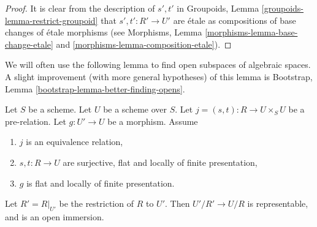 \begin{proof}
It is clear from the description of $s', t'$ in
Groupoids, Lemma \ref{groupoids-lemma-restrict-groupoid}
that $s' , t' : R' \to U'$ are \'etale
as compositions of base changes of \'etale morphisms
(see Morphisms, Lemma \ref{morphisms-lemma-base-change-etale}
and \ref{morphisms-lemma-composition-etale}).
\end{proof}

\noindent
We will often use the following lemma to find open subspaces of algebraic
spaces. A slight improvement (with more general hypotheses) of this lemma is
Bootstrap, Lemma \ref{bootstrap-lemma-better-finding-opens}.

\begin{lemma}
\label{lemma-finding-opens}
Let $S$ be a scheme.
Let $U$ be a scheme over $S$.
Let $j = (s, t) : R \to U \times_S U$ be a pre-relation.
Let $g : U' \to U$ be a morphism.
Assume
\begin{enumerate}
\item $j$ is an equivalence relation,
\item $s, t : R \to U$ are surjective, flat and
locally of finite presentation,
\item $g$ is flat and locally of finite presentation.
\end{enumerate}
Let $R' = R|_{U'}$ be the restriction of $R$ to $U'$. Then
$U'/R' \to U/R$ is representable, and is an open immersion.
\end{lemma}

